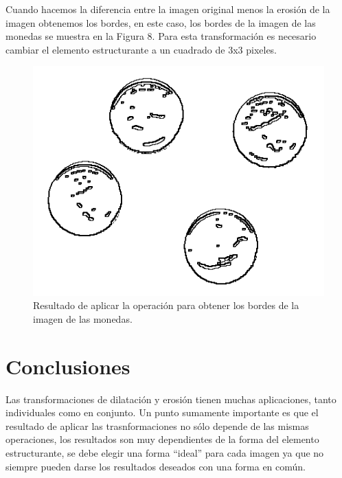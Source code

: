 \documentclass[conference]{IEEEtran}
\begin{document}
\newpage
Cuando hacemos la diferencia entre la imagen original menos la erosi\'on de la imagen obtenemos los bordes, en este caso, los bordes de la imagen de las monedas se muestra en la Figura 8. Para esta transformaci\'on es necesario cambiar el elemento estructurante a un cuadrado de 3x3 pixeles.

\begin{figure}[h]
	\begin{center}
		\setlength{\unitlength}{0.00105in}
		\includegraphics[scale=0.30]{./images/bordes_out.png}
	\end{center}
	\caption{Resultado de aplicar la operaci\'on para obtener los bordes de la imagen de las monedas.}
\end{figure}

\section{Conclusiones}
Las transformaciones de dilataci\'on y erosi\'on tienen muchas aplicaciones, tanto individuales como en conjunto. Un punto sumamente importante es que el resultado de aplicar las trasnformaciones no s\'olo depende de las mismas operaciones, los resultados son muy dependientes de la forma del elemento estructurante, se debe elegir una forma ``ideal'' para cada imagen ya que no siempre pueden darse los resultados deseados con una forma en com\'un.



\end{document}
